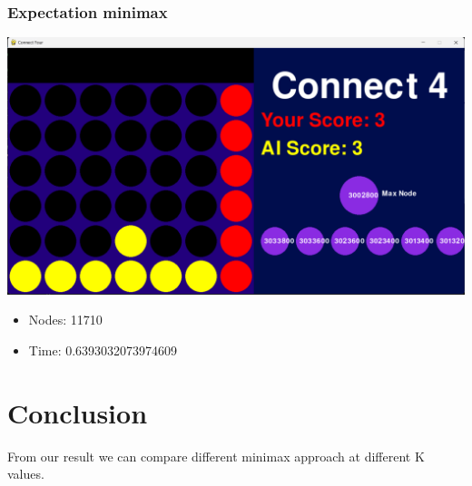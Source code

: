 \documentclass{article}
\begin{document}
\subsubsection*{Expectation minimax}
\begin{center}
    \includegraphics[width=0.8\linewidth]{testcase.png}
\end{center}
\begin{itemize}
    \item Nodes: 11710
    \item Time: 0.6393032073974609
\end{itemize}
\newpage
\section{Conclusion}
From our result we can compare different minimax approach at different K values.
\end{document}
